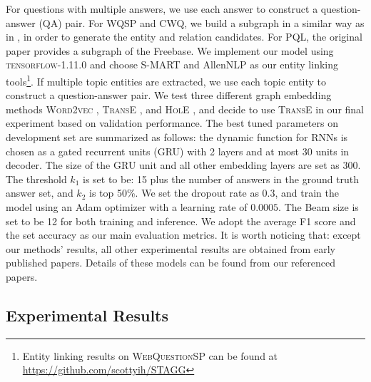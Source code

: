 For questions with multiple answers, we use each answer to construct a question-answer (QA) pair. For WQSP and CWQ, we build a subgraph in a similar way as in \cite{DBLP:conf/emnlp/SunDZMSC18}, in order to generate the entity and relation candidates. For PQL, the original paper provides a subgraph of the Freebase. We implement our model using \textsc{tensorflow-1.11.0} and choose S-MART \cite{DBLP:journals/corr/YangC16a} and AllenNLP \cite{Gardner2017AllenNLP} as our entity linking tools\footnote{Entity linking results on \textsc{WebQuestionSP} can be found at \url{https://github.com/scottyih/STAGG}}. If multiple topic entities are extracted, we use each topic entity to construct a question-answer pair. We test three different graph embedding methods \textsc{Word2vec} \cite{DBLP:journals/corr/abs-1301-3781}, \textsc{TransE} \cite{DBLP:conf/nips/BordesUGWY13}, and \textsc{HolE} \cite{DBLP:journals/corr/TrouillonN17}, and decide to use \textsc{TransE} in our final experiment based on validation performance. The best tuned parameters on development set are summarized as follows: the dynamic function for RNNs is chosen as a gated recurrent units (GRU) with 2 layers and at most 30 units in decoder. The size of the GRU unit and all other embedding layers are set as 300. The threshold $k_1$ is set to be: 15 plus the number of answers in the ground truth answer set, and $k_2$ is top 50\%. We set the dropout rate as 0.3, and train the model using an Adam optimizer with a learning rate of $0.0005$. The Beam size is set to be 12 for both training and inference. We adopt the average F1 score and the set accuracy as our main evaluation metrics. %
It is worth noticing that: except our methods' results, all other experimental results are obtained from early published papers. Details of these models can be found from our referenced papers.



\subsection{Experimental Results}



